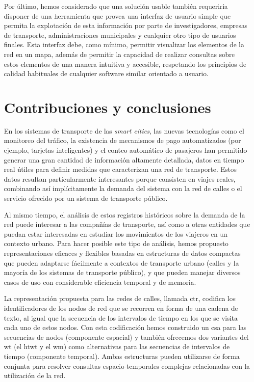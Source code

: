     \medskip
    Por \'ultimo, hemos considerado que una soluci\'on usable tambi\'en requerir\'ia disponer de una herramienta que provea una interfaz de usuario simple que permita la explotaci\'on de esta informaci\'on por parte de investigadores, empresas de transporte, administraciones municipales y cualquier otro tipo de usuarios finales. Esta interfaz debe, como m\'inimo, permitir visualizar los elementos de la red en un mapa, adem\'as de permitir la capacidad de realizar consultas sobre estos elementos de una manera intuitiva y accesible, respetando los principios de calidad habituales de cualquier software similar orientado a usuario.

\section{Contribuciones y conclusiones}
\label{sec:appendix-spanishsummary:conclusiones}

    En los sistemas de transporte de las \textit{smart cities}, las nuevas tecnolog\'ias como el monitoreo del tr\'afico, la existencia de mecanismos de pago automatizados (por ejemplo, tarjetas inteligentes) y el conteo autom\'atico de pasajeros han permitido generar una gran cantidad de informaci\'on altamente detallada, datos en tiempo real \'utiles para definir medidas que caracterizan una red de transporte. Estos datos resultan particularmente interesantes porque consisten en viajes reales, combinando as\'i impl\'icitamente la demanda del sistema con la red de calles o el servicio ofrecido por un sistema de transporte p\'ublico.

    Al mismo tiempo, el an\'alisis de estos registros hist\'oricos sobre la demanda de la red puede interesar a las compa\~n\'ias de transporte, as\'i como a otras entidades que puedan estar interesadas en estudiar los movimientos de los viajeros en un contexto urbano. Para hacer posible este tipo de an\'alisis, hemos propuesto representaciones eficaces y flexibles basadas en estructuras de datos compactas que pueden adaptarse f\'acilmente a contextos de transporte urbano (calles y la mayor\'ia de los sistemas de transporte p\'ublico), y que pueden manejar diversos casos de uso con considerable eficiencia temporal y de memoria.
    
    La representaci\'on propuesta para las redes de calles, llamada \gls{ctr}, codifica los identificadores de los nodos de red que se recorren en forma de una cadena de texto, al igual que la secuencia de los intervalos de tiempo en los que se visita cada uno de estos nodos. Con esta codificaci\'on hemos construido un \gls{csa} para las secuencias de nodos (componente espacial) y tambi\'en ofrecemos dos variantes del \gls{wt} (el \gls{htwt} y el \gls{wm}) como alternativas para las secuencias de intervalos de tiempo (componente temporal). Ambas estructuras pueden utilizarse de forma conjunta para resolver consultas \mbox{espacio-temporales} complejas relacionadas con la utilizaci\'on de la red.

